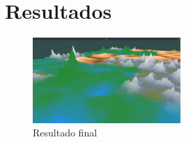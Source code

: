 \chapter{Resultados}

\begin{figure}[H]
    \centering
    \includegraphics[width=0.5\textwidth]{figuras/ssFinalResult.png}
    \caption{Resultado final}
    \label{fig:ssFinalResult}
\end{figure}